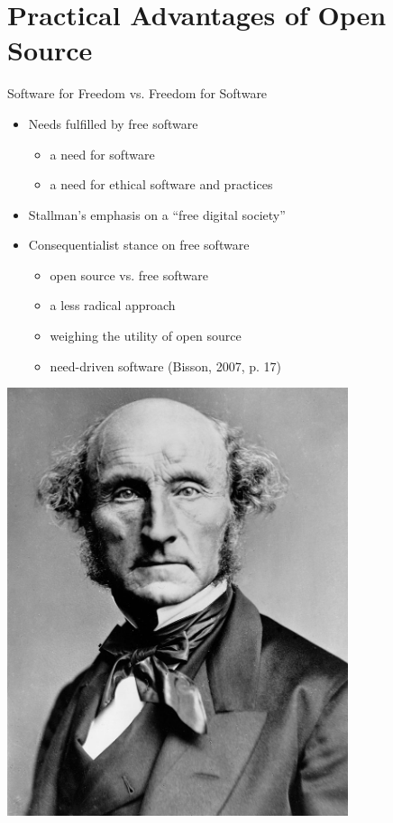 \section{Practical Advantages of Open Source}\frame{\sectionpage}

\begin{frame}{Software for Freedom vs. Freedom for Software}
\begin{minipage}{0.5\textwidth}
\begin{itemize}
  \item Needs fulfilled by free software
    \begin{itemize}
      \item a need for software
      \item a need for ethical software and practices
      \end{itemize}
   \item Stallman's emphasis on a ``free digital society''
   \item Consequentialist stance on free software
    \begin{itemize}
      \item open source vs. free software
      \item a less radical approach
      \item weighing the utility of open source
      \item need-driven software (Bisson, 2007, p. 17) 
    \end{itemize}
   \end{itemize}
\end{minipage}
\begin{minipage}{0.45\textwidth}
\includegraphics[width = 0.75\textwidth]{mill.jpg}
\end{minipage}
\end{frame}


